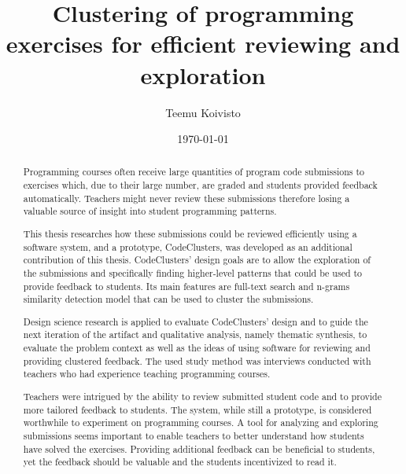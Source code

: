 \documentclass[english,twoside,openright]{HYgraduMLDS}
\title{Clustering of programming exercises for efficient reviewing and exploration}
\author{Teemu Koivisto}
\date{\today}
\begin{document}
\maketitle


\begin{abstract}
Programming courses often receive large quantities of program code submissions to exercises which, due to their large number, are graded and students provided feedback automatically. Teachers might never review these submissions therefore losing a valuable source of insight into student programming patterns.

This thesis researches how these submissions could be reviewed efficiently using a software system, and a prototype, CodeClusters, was developed as an additional contribution of this thesis. CodeClusters' design goals are to allow the exploration of the submissions and specifically finding higher-level patterns that could be used to provide feedback to students. Its main features are full-text search and n-grams similarity detection model that can be used to cluster the submissions.

Design science research is applied to evaluate CodeClusters' design and to guide the next iteration of the artifact and qualitative analysis, namely thematic synthesis, to evaluate the problem context as well as the ideas of using software for reviewing and providing clustered feedback. The used study method was interviews conducted with teachers who had experience teaching programming courses.

Teachers were intrigued by the ability to review submitted student code and to provide more tailored feedback to students. The system, while still a prototype, is considered worthwhile to experiment on programming courses. A tool for analyzing and exploring submissions seems important to enable teachers to better understand how students have solved the exercises. Providing additional feedback can be beneficial to students, yet the feedback should be valuable and the students incentivized to read it.

\end{abstract}

\mytableofcontents
\end{document}
